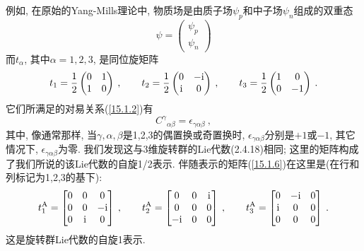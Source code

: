 例如, 在原始的Yang-Mills理论中, 物质场是由质子场$\psi_{p}$和中子场$\psi_{n}$组成的双重态
\[
\psi =
\begin{pmatrix}
\psi _{p} \\
\psi _{n}%
\end{pmatrix}%
\]
而$t_{\alpha }$, 其中$\alpha =1,2,3$, 是同位旋矩阵
\[
t_{1}=\frac{1}{2}\begin{pmatrix}
    0 & 1 \\
    1 & 0%
\end{pmatrix} \:, \qquad 
t_{2}=\frac{1}{2}\begin{pmatrix}
    0 & -\mi \\
\mi & 0%
\end{pmatrix} \:,\qquad 
t_{3}=\frac{1}{2}\begin{pmatrix}
    1 & 0 \\
    0 & -1%
\end{pmatrix} \:.
\]%
它们所满足的对易关系(\ref{15.1.2})有
\[
C^{\gamma}{}_{\alpha \beta}=\epsilon _{\gamma \alpha \beta } \:,
\]%
其中, 像通常那样, 当$\gamma ,\alpha ,\beta $是1,2,3的偶置换或奇置换时,
$\epsilon _{\gamma \alpha \beta }$分别是$+1$或$-1$, 其它情况下, $\epsilon _{\gamma \alpha \beta }$为零. 
我们发现这与3维旋转群的Lie代数(2.4.18)相同; 这里的矩阵构成了我们所说的该Lie代数的自旋1/2表示. 
伴随表示的矩阵(\ref{15.1.6})在这里是(在行和列标记为1,2,3的基下):%
\[
t_{1}^{\text{A}}=\begin{bmatrix}
0 & 0 & 0 \\
0 & 0 & -\mi \\
0 & \mi & 0%
\end{bmatrix}  \: ,\qquad 
t_{2}^{\text{A}}=\begin{bmatrix}
    0 & 0 & \mi \\
    0 & 0 & 0 \\
    -\mi & 0 & 0%
\end{bmatrix} \:, \qquad 
t_{3}^{\text{A}}=
\begin{bmatrix}
    0 & -\mi & 0 \\
\mi & 0 & 0 \\
0 & 0 & 0%
\end{bmatrix} \:.
\]%
这是旋转群Lie代数的自旋1表示.

